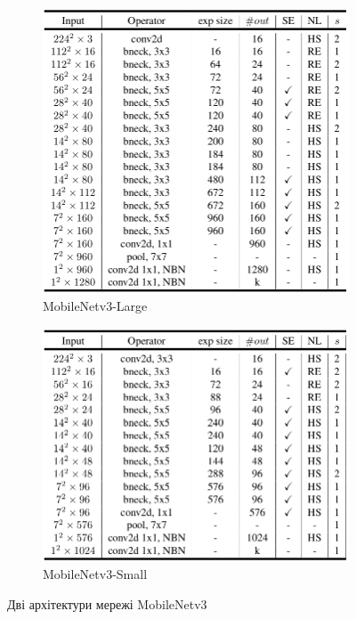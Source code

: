 \begin{figure}[H]
    \centering
    \begin{subfigure}[c]{0.4\textwidth}
        \centering
        \includegraphics[width=\textwidth]{images/cnn_mobilenetv3_large_architecture}
        \caption{MobileNetv3-Large
        }
    \end{subfigure}
    \begin{subfigure}[c]{0.4\textwidth}
        \centering
        \includegraphics[width=\textwidth]{images/cnn_mobilenetv3_small_architecture}
        \caption{MobileNetv3-Small
        }
    \end{subfigure}
    \caption{Дві архітектури мережі MobileNetv3 \cite{mobilenetv3}
        \label{fig:cnn:mobilenetv3_architecture}
    }
\end{figure}


